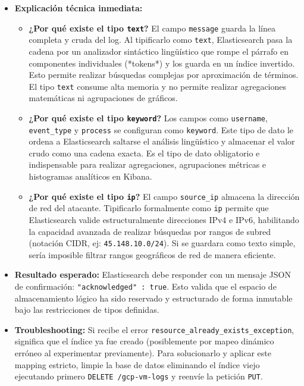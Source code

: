 \documentclass[
  coursetitle={Cómputo Nube y Tecnologías Emergentes},
  coursehours={96},
  coursedate={Verano 2026},
  doctype={Guía de Laboratorio Práctico},
  otherlangs={english,french},
  authorname={Lázaro},
  authorsurname={Bustio-Martínez},
  authortitle={PhD},
  role={Profesor Investigador},
  email={lbustio@inaoe.mx},
  phone={5559504000},
  ext={7459},
  institution={Instituto Nacional de Astrofísica, Óptica y Electrónica (INAOE)},
  department={Maestría en Ciencias en Tecnologías de Seguridad},
  address={Luis Enrique Erro 1, Sta. Ma. Tonantzintla, San Andrés Cholula, CP 72840, Puebla, México},
  margin={0.5in}
]{../../lbustio_lecture_notes}
\begin{document}
\begin{itemize}
    \item \textbf{Explicación técnica inmediata:} 
    \begin{itemize}
        \item \textbf{¿Por qué existe el tipo \texttt{text}?} El campo \texttt{message} guarda la línea completa y cruda del log. Al tipificarlo como \texttt{text}, Elasticsearch pasa la cadena por un analizador sintáctico lingüístico que rompe el párrafo en componentes individuales (*tokens*) y los guarda en un índice invertido. Esto permite realizar búsquedas complejas por aproximación de términos. El tipo \texttt{text} consume alta memoria y no permite realizar agregaciones matemáticas ni agrupaciones de gráficos.
        \item \textbf{¿Por qué existe el tipo \texttt{keyword}?} Los campos como \texttt{username}, \texttt{event\_type} y \texttt{process} se configuran como \texttt{keyword}. Este tipo de dato le ordena a Elasticsearch saltarse el análisis lingüístico y almacenar el valor crudo como una cadena exacta. Es el tipo de dato obligatorio e indispensable para realizar agregaciones, agrupaciones métricas e histogramas analíticos en Kibana.
        \item \textbf{¿Por qué existe el tipo \texttt{ip}?} El campo \texttt{source\_ip} almacena la dirección de red del atacante. Tipificarlo formalmente como \texttt{ip} permite que Elasticsearch valide estructuralmente direcciones IPv4 e IPv6, habilitando la capacidad avanzada de realizar búsquedas por rangos de subred (notación CIDR, ej: \texttt{45.148.10.0/24}). Si se guardara como texto simple, sería imposible filtrar rangos geográficos de red de manera eficiente.
    \end{itemize}
    
    \item \textbf{Resultado esperado:} Elasticsearch debe responder con un mensaje JSON de confirmación: \texttt{"acknowledged" : true}. Esto valida que el espacio de almacenamiento lógico ha sido reservado y estructurado de forma inmutable bajo las restricciones de tipos definidas.
    
    \item \textbf{Troubleshooting:} Si recibe el error \texttt{resource\_already\_exists\_exception}, significa que el índice ya fue creado (posiblemente por mapeo dinámico erróneo al experimentar previamente). Para solucionarlo y aplicar este mapping estricto, limpie la base de datos eliminando el índice viejo ejecutando primero \texttt{DELETE /gcp-vm-logs} y reenvíe la petición \texttt{PUT}.
\end{itemize}
\end{document}
